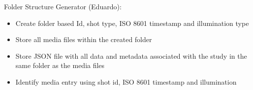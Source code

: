 Folder Structure Generator (Eduardo):
\begin{itemize}
	\item Create folder based Id, shot type, ISO 8601 timestamp and illumination type
	\item Store all media files within the created folder 
	\item Store JSON file with all data and metadata associated with the study in the same folder as the media files
	\item Identify media entry using shot id, ISO 8601 timestamp and illumination
\end{itemize}
